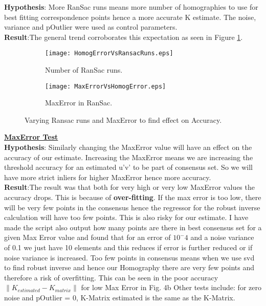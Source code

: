 \documentclass[titlepage]{article}
\begin{document}
\textbf{Hypothesis}: More RanSac runs means more number of homographies to use for best fitting correspondence points hence a more accurate K estimate. The noise, variance and pOutlier were used as control parameters. \\
\textbf{Result}:The general trend corroborates this expectation as seen in Figure \ref{RansacRunsVsAccuracy}.
\begin{figure}[H]
\begin{center}
\begin{subfigure}{0.25\textwidth}
\texttt{[image: HomogErrorVsRansacRuns.eps]}
\caption{Number of RanSac runs.}
\label{RansacRunsVsAccuracy}
\end{subfigure}\hspace{2cm}
\begin{subfigure}{0.25\textwidth}
\texttt{[image: MaxErrorVsHomogError.eps]}
\caption{MaxError in RanSac.}
\label{MaxErrorVsAccuracy}
\end{subfigure} 
\caption{Varying Ransac runs and MaxError to find effect on Accuracy.}
\end{center}
\end{figure}
\textbf{\underline{MaxError Test}}\\
\textbf{Hypothesis}: Similarly changing the MaxError value will have an effect on the accuracy of our estimate. Increasing the MaxError means we are increasing the threshold accuracy for an estimated u'v' to be part of consensus set. So we will have more strict inliers for higher MaxError hence more accuracy.\\

\textbf{Result}:The result was that both for very high or very low MaxError values the accuracy drops. This is because of \textbf{over-fitting}. If the max error is too low, there will be very few points in the consensus hence the regressor for the robust inverse calculation will have too few points. This is also risky for our estimate. I have made the script also output how many points are there in best consensus set for a given Max Error value and found that for an error of $10^-4$ and a noise variance of 0.1 we just have 10 elements and this reduces if error is further reduced or if noise variance is increased. Too few points in consensus means when we use svd to find robust inverse and hence our Homography there are very few points and therefore a risk of overfitting. This can be seen in the poor accuracy $\|K_{estimated} - K_{matrix}\|$ for low Max Error in Fig. 4b 
%
Other tests include: for zero noise and pOutlier = 0, K-Matrix estimated is the same as the K-Matrix.
\bigskip
\end{document}
